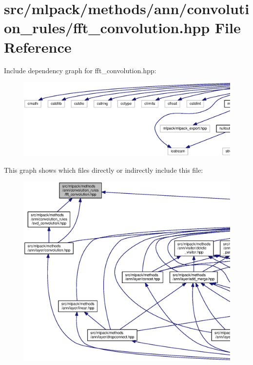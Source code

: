 \section{src/mlpack/methods/ann/convolution\+\_\+rules/fft\+\_\+convolution.hpp File Reference}
\label{fft__convolution_8hpp}
Include dependency graph for fft\+\_\+convolution.\+hpp\+:
\nopagebreak
\begin{figure}[H]
\begin{center}
\leavevmode
\includegraphics[width=350pt]{fft__convolution_8hpp__incl}
\end{center}
\end{figure}
This graph shows which files directly or indirectly include this file\+:
\nopagebreak
\begin{figure}[H]
\begin{center}
\leavevmode
\includegraphics[width=350pt]{fft__convolution_8hpp__dep__incl}
\end{center}
\end{figure}

